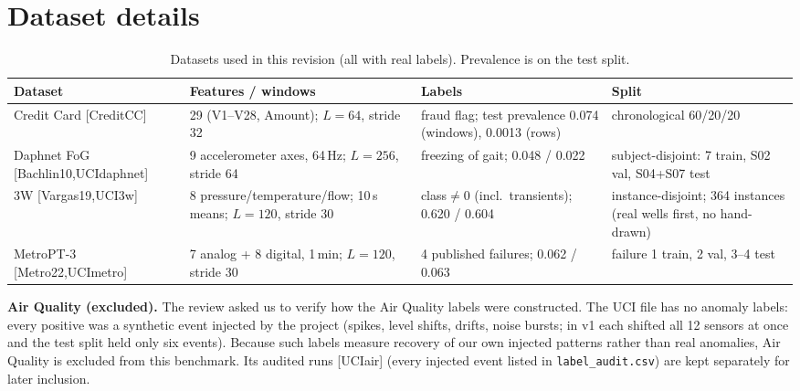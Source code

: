 \documentclass[twoside,english]{article}
\renewcommand{\cite}[1]{[#1]}
\begin{document}
\section{Dataset details} \label{sec:data}
\begin{table}[h]
\centering\small
\caption{Datasets used in this revision (all with real labels). Prevalence is on the test split.}
\label{tab:data}
\begin{tabular}{p{0.9in}p{1.55in}p{1.6in}p{1.9in}}
\toprule
Dataset & Features / windows & Labels & Split \\
\midrule
Credit Card \cite{CreditCC} & 29 (V1--V28, Amount); $L{=}64$, stride 32 & fraud flag; test prevalence 0.074 (windows), 0.0013 (rows) & chronological 60/20/20 \\
Daphnet FoG \cite{Bachlin10,UCIdaphnet} & 9 accelerometer axes, 64\,Hz; $L{=}256$, stride 64 & freezing of gait; 0.048 / 0.022 & subject-disjoint: 7 train, S02 val, S04+S07 test \\
3W \cite{Vargas19,UCI3w} & 8 pressure/temperature/flow; 10\,s means; $L{=}120$, stride 30 & class$\neq$0 (incl.\ transients); 0.620 / 0.604 & instance-disjoint; 364 instances (real wells first, no hand-drawn) \\
MetroPT-3 \cite{Metro22,UCImetro} & 7 analog + 8 digital, 1\,min; $L{=}120$, stride 30 & 4 published failures; 0.062 / 0.063 & failure 1 train, 2 val, 3--4 test \\
\bottomrule
\end{tabular}
\end{table}

\textbf{Air Quality (excluded).} The review asked us to verify how the Air Quality labels were constructed. The UCI file has no anomaly labels: every positive was a synthetic event injected by the project (spikes, level shifts, drifts, noise bursts; in v1 each shifted all 12 sensors at once and the test split held only six events). Because such labels measure recovery of our own injected patterns rather than real anomalies, Air Quality is excluded from this benchmark. Its audited runs \cite{UCIair} (every injected event listed in \texttt{label\_audit.csv}) are kept separately for later inclusion.
\end{document}
